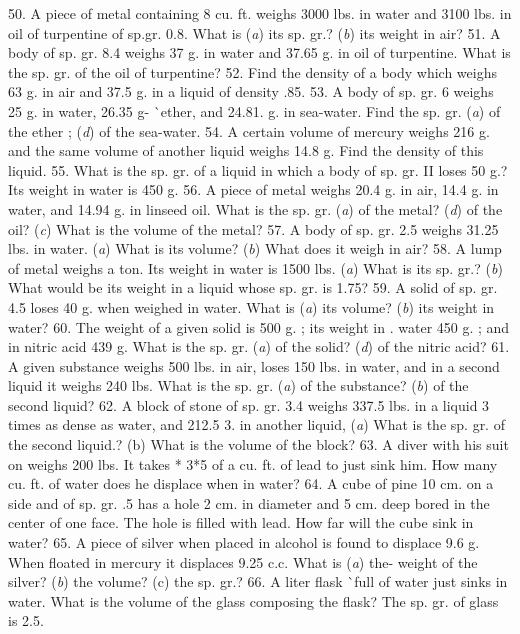 50. A piece of metal containing 8 cu. ft. weighs 3000 lbs. in water and 3100 lbs. in oil of turpentine of sp.gr. 0.8. What is (\emph{a}) its sp. gr.? (\emph{b}) its weight in air?
51. A body of sp. gr. 8.4 weighs 37 g. in water and 37.65 g. in oil of turpentine. What is the sp. gr. of the oil of turpentine?
52. Find the density of a body which weighs 63 g. in air and 37.5 g. in a liquid of density .85.
53. A body of sp. gr. 6 weighs 25 g. in water, 26.35 g- ^^ ether, and 24.81. g. in sea-water. Find the sp. gr. (\emph{a}) of the ether ; (\emph{d}) of the sea-water.
54. A certain volume of mercury weighs 216 g. and the same volume of another liquid weighs 14.8 g. Find the density of this liquid.
55. What is the sp. gr. of a liquid in which a body of sp. gr. II loses 50 g.? Its weight in water is 450 g.
56. A piece of metal weighs 20.4 g. in air, 14.4 g. in water, and 14.94 g. in linseed oil. What is the sp. gr. (\emph{a}) of the metal? (\emph{d}) of the oil? (\emph{c}) What is the volume of the metal?
57. A body of sp. gr. 2.5 weighs 31.25 lbs. in water. (\emph{a}) What is its volume? (\emph{b}) What does it weigh in air?
58. A lump of metal weighs a ton. Its weight in water is 1500 lbs. (\emph{a}) What is its sp. gr.? (\emph{b}) What would be its weight in a liquid whose sp. gr. is 1.75?
59. A solid of sp. gr. 4.5 loses 40 g. when weighed in water. What is (\emph{a}) its volume? (\emph{b}) its weight in water?
60. The weight of a given solid is 500 g. ; its weight in . water 450 g. ; and in nitric acid 439 g. What is the sp. gr. (\emph{a}) of the solid? (\emph{d}) of the nitric acid?
61. A given substance weighs 500 lbs. in air, loses 150 lbs. in water, and in a second liquid it weighs 240 lbs. What is the sp. gr. (\emph{a}) of the substance? (\emph{b}) of the second liquid?
62. A block of stone of sp. gr. 3.4 weighs 337.5 lbs. in a liquid 3 times as dense as water, and 212.5 ^^s. in another liquid, (\emph{a}) What is the sp. gr. of the second liquid.? (b) What is the volume of the block?
63. A diver with his suit on weighs 200 lbs. It takes * 3*5 of a cu. ft. of lead to just sink him. How many cu. ft. of water does he displace when in water?
64. A cube of pine 10 cm. on a side and of sp. gr. .5 has a hole 2 cm. in diameter and 5 cm. deep bored in the center of one face. The hole is filled with lead. How far will the cube sink in water?
65. A piece of silver when placed in alcohol is found to displace 9.6 g. When floated in mercury it displaces 9.25 c.c. What is (\emph{a}) the- weight of the silver? (\emph{b}) the volume? (c) the sp. gr.?
66. A liter flask ^^ full of water just sinks in water. What is the volume of the glass composing the flask? The sp. gr. of glass is 2.5.
